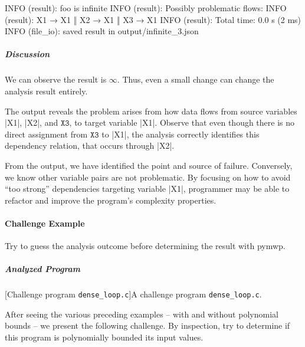 \begin{center}
\begin{minipage}{\textwidth}
\begin{outlisting}[label={lst:ex4-output}]
INFO (result): foo is infinite
INFO (result): Possibly problematic flows:
INFO (result): X1 → X1 ‖ X2 → X1 ‖ X3 → X1
INFO (result): Total time: 0.0 s (2 ms)
INFO (file_io): saved result in output/infinite_3.json
\end{outlisting}
\end{minipage}
\end{center}

\subparagraph*{Discussion}

We can observe the result is \(\infty\).
Thus, even a small change can change the analysis result entirely.

The output reveals the problem arises from how data flows from source variables \pr|X1|, \pr|X2|, and \(\texttt{X3}\), to target variable \pr|X1|.
Observe that even though there is no direct assignment from \(\texttt{X3}\) to \pr|X1|, the analysis correctly identifies this dependency relation, that occurs through \pr|X2|.

From the output, we have identified the point and source of failure.
Conversely, we know other variable pairs are not problematic.
By focusing on how to avoid \enquote{too strong} dependencies targeting variable \pr|X1|, programmer may be able to refactor and improve the program's complexity properties.

\paragraph{Challenge Example}\label{challenge-example}
Try to guess the analysis outcome before determining the result with pymwp.

\subparagraph*{Analyzed Program}

\begin{center}
\begin{minipage}{\textwidth}
\captionsetup{type=lstlisting}
[Challenge program \texttt{dense\_loop.c}]{A challenge program \texttt{dense\_loop.c}.}
\label{lst:challange}
\end{minipage}
\end{center}

After seeing the various preceding examples -- with and without polynomial bounds -- we present the following challenge.
By inspection, try to determine if this program is polynomially bounded \wrt its input values.


